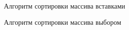 \documentclass[12pt]{report}
\begin{document}
\newpage
\begin{figure}[h]
	\caption{Алгоритм сортировки массива вставками}
	\label{figure:image}
\end{figure}

\newpage
\begin{figure}[h]
	\caption{Алгоритм сортировки массива выбором}
	\label{figure:image}
\end{figure}
\end{document}
